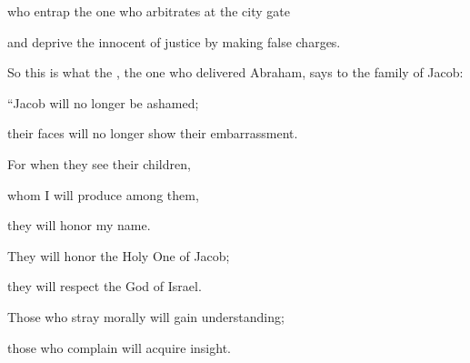 {\par }{\Q who entrap
the one who arbitrates
at the city gate
\par }{\Q and deprive
the innocent
of justice by making false charges.
\par }{\Q {}So
this is what
the {}, the one who
delivered
Abraham,
says
to
the family
of Jacob:

\par }{\Q “Jacob
will no
longer be ashamed;
\par }{\Q their faces will no
longer show their embarrassment.
\par }{\Q {}For
when they see
their children,
\par }{\Q whom I will produce
among
them,

\par }{\Q they
will honor
my name.
\par }{\Q They
will honor
the
Holy One
of Jacob;
\par }{\Q they will respect
the God
of Israel.
\par }{\Q {}Those who stray
morally
will gain
understanding;
\par }{\Q those who complain
will acquire insight.

\par }
